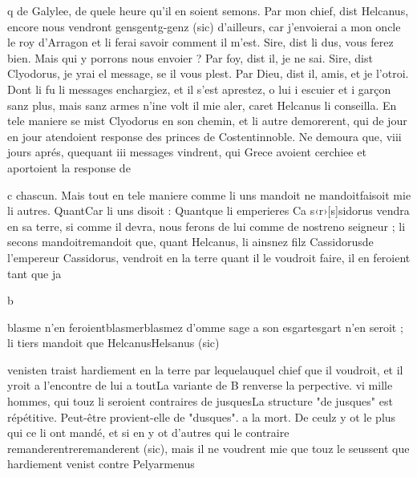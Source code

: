 \documentclass{article}
\begin{document}
\begin{pages}
                     q de Galylee, de quele heure qu’il 
                     en soient semons.
               Par mon chief, dist Helcanus, encore nous vendront 
                     gensgentg-genz (sic) d’ailleurs, car j’envoierai a mon
                     oncle le roy d’Arragon et li ferai savoir comment il
                  m’est.
               Sire, dist li
                     dus, vous ferez bien. Mais qui y porrons nous envoier ?
               Par foy, dist il, je ne sai.
               Sire, dist Clyodorus, je yrai el message, se il vous plest.
               Par Dieu, dist il, amis, et je l’otroi. Dont
               li fu li messages enchargiez, et 
                  il s’est aprestez, o lui i escuier et i garçon sanz plus,
               mais sanz armes 
                  n’ine volt il mie aler, 
                  caret
               Helcanus li conseilla. \pend
            \pstart En tele maniere se mist Clyodorus en son chemin, et li autre demorerent, qui de jour en jour
               atendoient response des princes de Costentinnoble. Ne demoura que, viii jours aprés, 
                  quequant
               iii messages vindrent, qui Grece
               avoient cerchiee et aportoient la response de
                  
                  c chascun. Mais tout en tele maniere comme li uns mandoit ne 
                  mandoitfaisoit mie li autres. 
                  QuantCar li uns disoit : 
                     Quantque li emperieres Ca
                        s‹r›[s]sidorus vendra en sa terre, si comme il devra, nous ferons de
                  lui comme de 
                     nostreno seigneur ; li secons 
                  mandoitremandoit que, quant Helcanus, li ainsnez filz 
                     Cassidorusde l'empereur Cassidorus, vendroit en la terre quant il le voudroit faire, il en feroient tant que ja
                     
                     b
                  

                     blasme n'en feroientblasmerblasmez d’omme sage a son 
                     esgartesgart n'en seroit ; li tiers mandoit que 
                        HelcanusHelsanus (sic)
                  
                     venisten traist hardiement en la terre 
                     par lequelauquel chief que il voudroit, 
                     et il yroit a l’encontre de 
                     lui a toutLa variante de B renverse la perpective.
                  vi mille hommes, qui touz li seroient contraires de jusquesLa structure "de jusques" est répétitive. Peut-être
                     provient-elle de "dusques". a la mort. De ceulz y ot le plus qui
               ce li ont mandé, et si en y ot d’autres qui le contraire 
                  remanderentreremanderent (sic), mais il ne voudrent mie que touz le seussent que hardiement venist
               contre Pelyarmenus
               

\end{pages}
\end{document}
